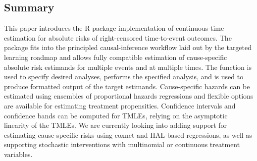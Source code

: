 \documentclass{report}
\newcommand{\1}{\ensuremath{\mathbf{1}}}
\begin{document}
\subsection{Summary}
\label{sec:org451c014}
This paper introduces the  R package implementation of continuous-time estimation for absolute risks of right-censored time-to-event outcomes. The package fits into the principled causal-inference workflow laid out by the targeted learning roadmap and allows fully compatible estimation of cause-specific absolute risk estimands for multiple events and at multiple times. The  function is used to specify desired analyses,  performs the specified analysis, and  is used to produce formatted output of the target estimands. Cause-specific hazards can be estimated using ensembles of proportional hazards regressions and flexible options are available for estimating treatment propensities. Confidence intervals and confidence bands can be computed for TMLEs, relying on the asymptotic linearity of the TMLEs. We are currently looking into adding support for estimating cause-specific risks using coxnet and HAL-based regressions, as well as supporting stochastic interventions with multinomial or continuous treatment variables. 


\newpage

\end{document}
